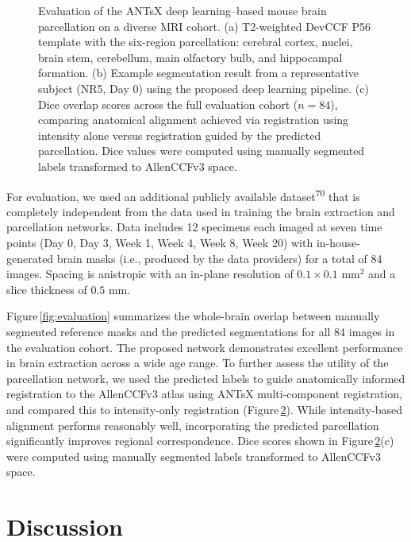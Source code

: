 \documentclass[
  12pt,
]{article}
\begin{document}
\begin{figure}
\begin{subfigure}{.75\textwidth}
  \caption{}
  \label{fig:subc}
\end{subfigure}
\caption{Evaluation of the ANTsX deep learning–based mouse brain parcellation on
a diverse MRI cohort. (a) T2-weighted DevCCF P56 template with the six-region
parcellation: cerebral cortex, nuclei, brain stem, cerebellum, main olfactory
bulb, and hippocampal formation. (b) Example segmentation result from a
representative subject (NR5, Day 0) using the proposed deep learning pipeline.
(c) Dice overlap scores across the full evaluation cohort ($n=84$), comparing
anatomical alignment achieved via registration using intensity alone versus
registration guided by the predicted parcellation. Dice values were computed
using manually segmented labels transformed to AllenCCFv3 space.}
\label{fig:evaluationParcellation}
\end{figure}

For evaluation, we used an additional publicly available
dataset\textsuperscript{70} that is completely independent from the data
used in training the brain extraction and parcellation networks. Data
includes 12 specimens each imaged at seven time points (Day 0, Day 3,
Week 1, Week 4, Week 8, Week 20) with in-house-generated brain masks
(i.e., produced by the data providers) for a total of 84 images. Spacing
is anistropic with an in-plane resolution of \(0.1 \times 0.1\) mm\(^2\)
and a slice thickness of \(0.5\) mm.

Figure\,\ref{fig:evaluation} summarizes the whole-brain overlap between
manually segmented reference masks and the predicted segmentations for
all 84 images in the evaluation cohort. The proposed network
demonstrates excellent performance in brain extraction across a wide age
range. To further assess the utility of the parcellation network, we
used the predicted labels to guide anatomically informed registration to
the AllenCCFv3 atlas using ANTsX multi-component registration, and
compared this to intensity-only registration
(Figure\,\ref{fig:evaluationParcellation}). While intensity-based
alignment performs reasonably well, incorporating the predicted
parcellation significantly improves regional correspondence. Dice scores
shown in Figure\,\ref{fig:evaluationParcellation}(c) were computed using
manually segmented labels transformed to AllenCCFv3 space. \clearpage
\newpage

\section{Discussion}\label{discussion}
\end{document}
